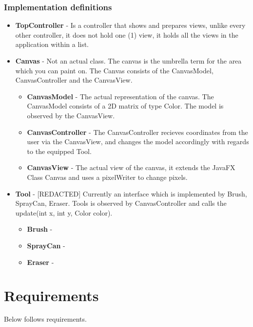 \documentclass[12pt,a4paper]{scrartcl}
\begin{document}
\subsubsection{Implementation definitions}   
\begin{itemize}
    \item \textbf{TopController} - Is a controller that shows and prepares views, unlike every other controller, it does not hold one (1) view, it holds all the views in the application within a list.

    \item \textbf{Canvas} - Not an actual class. The canvas is the umbrella term for the area which you can paint on. The Canvas consists of the CanvasModel, CanvasController and the CanvasView. 

    \begin{itemize}
         \item \textbf{CanvasModel} - The actual representation of the canvas. The CanvasModel consists of a 2D matrix of type Color. The model is observed by the CanvasView.
         \item \textbf{CanvasController} - The CanvasController recieves coordinates from the user via the CanvasView, and changes the model accordingly with regards to the equipped Tool.
        \item \textbf{CanvasView} - The actual view of the canvas, it extends the JavaFX Class Canvas and uses a pixelWriter to change pixels.
    \end{itemize} 

    \item \textbf{Tool} - \Huge{[REDACTED]} \small Currently an interface which is implemented by Brush, SprayCan, Eraser. Tools is observed by CanvasController and calls the update(int x, int y, Color color).
    
    \begin{itemize}
        \item \textbf{Brush} -
        \item \textbf{SprayCan} -
        \item \textbf{Eraser} -
    \end{itemize}

\end{itemize}

\newpage
\section{Requirements}
Below follows requirements.
\end{document}
